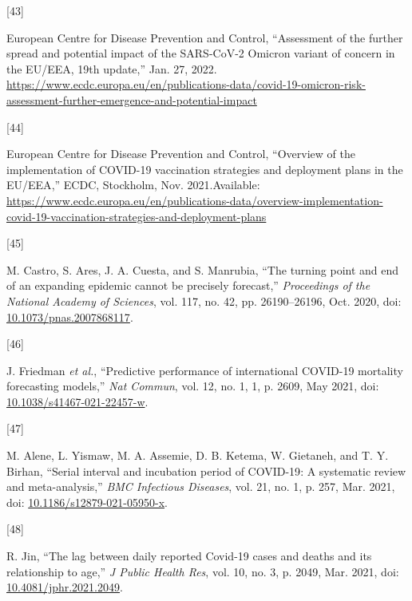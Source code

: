\documentclass[
]{article}
\newlength{\cslhangindent}
\newlength{\csllabelwidth}
\newlength{\cslentryspacingunit} %
\newenvironment{CSLReferences}[2] %
 {%
  \setlength{\parindent}{0pt}
  \ifodd #1
  \let\oldpar\par
  \def\par{\hangindent=\cslhangindent\oldpar}
  \fi
  \setlength{\parskip}{#2\cslentryspacingunit}
 }%
 {}
\newcommand{\CSLLeftMargin}[1]{\parbox[t]{\csllabelwidth}{#1}}
\newcommand{\CSLRightInline}[1]{\parbox[t]{\linewidth - \csllabelwidth}{#1}\break}
\begin{document}
\begin{CSLReferences}{0}{0}
\leavevmode{}%
\CSLLeftMargin{{[}43{]} }
\CSLRightInline{European Centre for Disease Prevention and Control, {``Assessment of the further spread and potential impact of the {SARS-CoV-2 Omicron} variant of concern in the {EU}/{EEA}, 19th update,''} Jan. 27, 2022. \url{https://www.ecdc.europa.eu/en/publications-data/covid-19-omicron-risk-assessment-further-emergence-and-potential-impact}}

\leavevmode{}%
\CSLLeftMargin{{[}44{]} }
\CSLRightInline{European Centre for Disease Prevention and Control, {``Overview of the implementation of {COVID-19} vaccination strategies and deployment plans in the {EU}/{EEA},''} {ECDC}, {Stockholm}, Nov. 2021.Available: \url{https://www.ecdc.europa.eu/en/publications-data/overview-implementation-covid-19-vaccination-strategies-and-deployment-plans}}

\leavevmode{}%
\CSLLeftMargin{{[}45{]} }
\CSLRightInline{M. Castro, S. Ares, J. A. Cuesta, and S. Manrubia, {``The turning point and end of an expanding epidemic cannot be precisely forecast,''} \emph{Proceedings of the National Academy of Sciences}, vol. 117, no. 42, pp. 26190--26196, Oct. 2020, doi: \href{https://doi.org/10.1073/pnas.2007868117}{10.1073/pnas.2007868117}.}

\leavevmode{}%
\CSLLeftMargin{{[}46{]} }
\CSLRightInline{J. Friedman \emph{et al.}, {``Predictive performance of international {COVID-19} mortality forecasting models,''} \emph{Nat Commun}, vol. 12, no. 1, 1, p. 2609, May 2021, doi: \href{https://doi.org/10.1038/s41467-021-22457-w}{10.1038/s41467-021-22457-w}.}

\leavevmode{}%
\CSLLeftMargin{{[}47{]} }
\CSLRightInline{M. Alene, L. Yismaw, M. A. Assemie, D. B. Ketema, W. Gietaneh, and T. Y. Birhan, {``Serial interval and incubation period of {COVID-19}: A systematic review and meta-analysis,''} \emph{BMC Infectious Diseases}, vol. 21, no. 1, p. 257, Mar. 2021, doi: \href{https://doi.org/10.1186/s12879-021-05950-x}{10.1186/s12879-021-05950-x}.}

\leavevmode{}%
\CSLLeftMargin{{[}48{]} }
\CSLRightInline{R. Jin, {``The lag between daily reported {Covid-19} cases and deaths and its relationship to age,''} \emph{J Public Health Res}, vol. 10, no. 3, p. 2049, Mar. 2021, doi: \href{https://doi.org/10.4081/jphr.2021.2049}{10.4081/jphr.2021.2049}.}


\end{CSLReferences}
\end{document}
